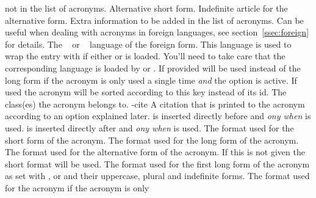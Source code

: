 \documentclass{acro-manual}
\begin{document}
\begin{properties}
    not in the list of acronyms.
    Alternative short form.
    Indefinite article for the alternative form.
    Extra information to be added in the list of acronyms.
    Can be useful when dealing with acronyms in foreign languages, see
    section~\vref{ssec:foreign} for details.
    The ~\cite{pkg:babel} or
    ~\cite{pkg:polyglossia} language of the foreign form.
    This language is used to wrap the entry with
     if either  or
     is loaded.  You'll need to take care that the
    corresponding language is loaded by  or .
    If provided  will be used instead of the long
    form if the acronym is only used a single time \emph{and} the option
     is active.
    If used the acronym will be sorted according to this key instead of its
    \acs{id}.
    The class(es) the acronym belongs to.
  \proplit-{cite}{}
    A citation that is printed to the acronym according to an option explained
    later.
     is inserted directly before 
    and \emph{ony when}  is used.
     is inserted directly after 
    and \emph{ony when}  is used.
    The format used for the short form of the acronym.
    The format used for the long form of the acronym.
    The format used for the alternative form of the
    acronym. If this is not given the short format will be used.
    The format used for the first long form of the acronym as set with ,
     or  and their uppercase, plural and indefinite forms.
    The format used for the acronym if the acronym is only

\end{properties}
\end{document}
